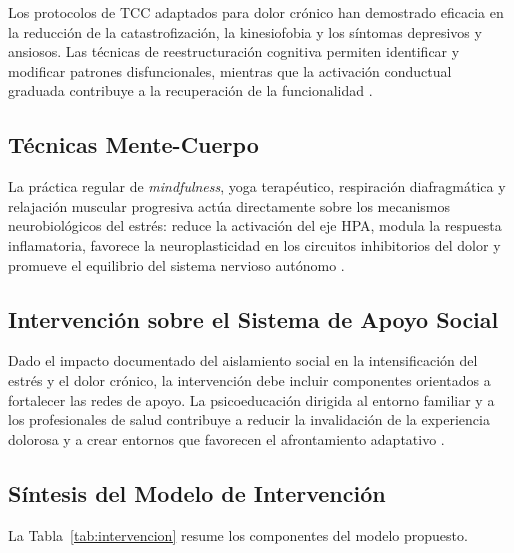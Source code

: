 \documentclass[12pt, a4paper]{article}
\begin{document}
Los protocolos de TCC adaptados para dolor crónico han demostrado eficacia en la reducción de
la catastrofización, la kinesiofobia y los síntomas depresivos y ansiosos. Las técnicas de
reestructuración cognitiva permiten identificar y modificar patrones disfuncionales, mientras
que la activación conductual graduada contribuye a la recuperación de la funcionalidad
\parencite{Aerts2018}.

\subsection{Técnicas Mente-Cuerpo}

La práctica regular de \textit{mindfulness}, yoga terapéutico, respiración diafragmática y
relajación muscular progresiva actúa directamente sobre los mecanismos neurobiológicos del
estrés: reduce la activación del eje HPA, modula la respuesta inflamatoria, favorece la
neuroplasticidad en los circuitos inhibitorios del dolor y promueve el equilibrio del sistema
nervioso autónomo \parencite{Tracey2021}.

\subsection{Intervención sobre el Sistema de Apoyo Social}

Dado el impacto documentado del aislamiento social en la intensificación del estrés y el dolor
crónico, la intervención debe incluir componentes orientados a fortalecer las redes de apoyo.
La psicoeducación dirigida al entorno familiar y a los profesionales de salud contribuye a
reducir la invalidación de la experiencia dolorosa y a crear entornos que favorecen el
afrontamiento adaptativo \parencite{Aerts2018, Wang2021}.

\subsection{Síntesis del Modelo de Intervención}

La Tabla~\ref{tab:intervencion} resume los componentes del modelo propuesto.
\end{document}
